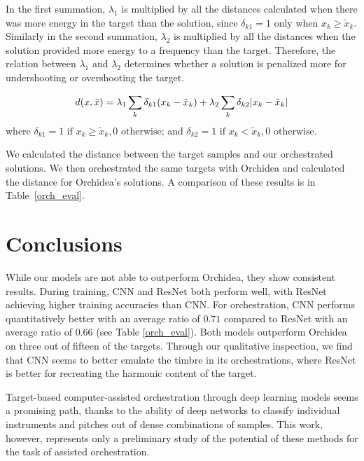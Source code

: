 \documentclass[runningheads,a4paper]{llncs}
\begin{document}
In the first summation, $\lambda_1$ is multiplied by all the distances calculated when there was more energy in the target than the solution, since $\delta_{k1} = 1$ only when $x_k \ge \tilde{x}_k$. Similarly in the second summation, $\lambda_2$ is multiplied by all the distances when the solution provided more energy to a frequency than the target. Therefore, the relation between $\lambda_1$ and $\lambda_2$ determines whether a solution is penalized more for undershooting or overshooting the target.

\begin{equation}\label{distance}
d(x, \tilde{x}) =\lambda_1 \sum_k \delta_{k1}(x_k - \tilde{x}_k) + \lambda_2 \sum_k \delta_{k2}|x_k - \tilde{x	}_k| \\
\end{equation}
where $\delta_{k1} = 1 \text{  if  } x_k \ge \tilde{x}_k, 0 \text{  otherwise}$; and $\delta_{k2} = 1 \text{  if  } x_k < \tilde{x}_k, 0 \text{  otherwise}$.

We calculated the distance between the target samples and our orchestrated solutions. We then orchestrated the same targets with Orchidea and calculated the distance for Orchidea's solutions. A comparison of these results is in Table~\ref{orch_eval}. 


\section{Conclusions}
\label{sec:conclusions}

While our models are not able to outperform Orchidea, they show consistent results. During training, CNN and ResNet both perform well, with ResNet achieving higher training accuracies than CNN. For orchestration, CNN performs quantitatively better with an average ratio of $0.71$ compared to ResNet with an average ratio of $0.66$ (see Table \ref{orch_eval}). Both models outperform Orchidea on three out of fifteen of the targets. Through our qualitative inspection, we find that CNN seems to better emulate the timbre in its orchestrations, where ResNet is better for recreating the harmonic content of the target.

Target-based computer-assisted orchestration through deep learning models seems a promising path, thanks to the ability of deep networks to classify individual instruments and pitches out of dense combinations of samples. This work, however, represents only a preliminary study of the potential of these methods for the task of assisted orchestration. 
\end{document}

